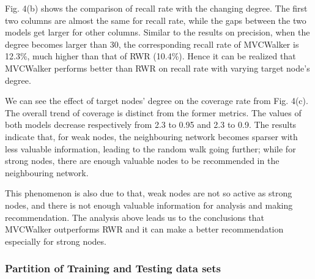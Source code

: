 \documentclass[10pt,journal,compsoc]{IEEEtran}
\begin{document}
Fig. 4(b) shows the comparison of recall rate with the changing degree. The first two columns are almost the same for recall rate, while the gaps between the two models get larger for other columns. Similar to the results on precision, when the degree becomes larger than 30, the corresponding recall rate of MVCWalker is 12.3\%, much higher than that of RWR (10.4\%). Hence it can be realized that MVCWalker performs better than RWR on recall rate with varying target node's degree.

We can see the effect of target nodes' degree on the coverage rate from Fig. 4(c). The overall trend of coverage is distinct from the former metrics. The values of both models decrease respectively from 2.3 to 0.95 and 2.3 to 0.9. The results indicate that, for weak nodes, the neighbouring network becomes sparser with less valuable information, leading to the random walk going further; while for strong nodes, there are enough valuable nodes to be recommended in the neighbouring network.

This phenomenon is also due to that, weak nodes are not so active as strong nodes, and there is not enough valuable information for analysis and making recommendation. The analysis above leads us to the conclusions that MVCWalker outperforms RWR and it can make a better recommendation especially for strong nodes.

\subsubsection{Partition of Training and Testing data sets}
\end{document}
